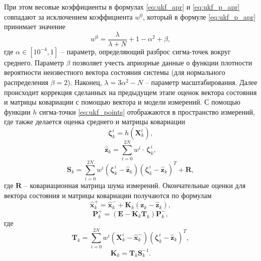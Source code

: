 При этом весовые коэффициенты в формулах \eqref{eq:ukf_apr} и \eqref{eq:ukf_p_apr} совпадают за исключением коэффициента  ${w^0}$, который в формуле \eqref{eq:ukf_p_apr} принимает значение \cite{Kulikova01}
\begin{equation}
w^0 = \frac{{{\lambda }}}{{{{\lambda }} + N}} + 1 - {{{\alpha }}^2} + {{\beta }},
\end{equation}
где
${{\alpha }} \in \left[ {{{10}^{ - 4}},1} \right]$
-- параметр, определяющий разброс сигма-точек вокруг среднего.
Параметр ${{\beta }}$  позволяет учесть априорные данные о функции плотности вероятности неизвестного вектора состояния системы (для нормального распределения  ${{\beta }} = 2$). Наконец, ${{\lambda }} = 3{{{\alpha }}^2} - N$ -- параметр масштабирования.
Далее происходит коррекция сделанных на предыдущем этапе оценок вектора состояния и матрицы ковариации с помощью вектора и модели измерений.
С помощью функции $h$ сигма-точки \eqref{eq:ukf_points} отображаются в пространство измерений, где также делается оценка среднего и матрицы ковариации
\begin{equation}
{\bm{\zeta }}_k^i = h\left( {{\bm{X}}_k^i} \right),
\end{equation}
\begin{equation}
{{{\bm{\hat z}}}_k} = \sum\limits_{i = 0}^{2N} {{w^i} \cdot } \,{\bm{\zeta }}_k^i,
\end{equation}
\begin{equation} \label{eq:ukf_s_k}
{{\bm{S}}_k} = \sum\limits_{i = 0}^{2N} {{w^i}\left( {{\bm{\zeta }}_k^i - {{{\bm{\hat z}}}_k}} \right)} {\left( {{\bm{\zeta }}_k^i - {{{\bm{\hat z}}}_k}} \right)^{{T}}} + {\bm{R}},
\end{equation}
где $\bm R$ -- ковариационная матрица шума измерений. Окончательные оценки для вектора состояния и матрицы ковариации получаются по формулам
\begin{equation}
{\bm{\hat x}}_k^ +  = {\bm{\hat x}}_k^ -  + {{\bm{K}}_k}({{\bm{z}}_k} - {{{\bm{\hat z}}}_k}),
\end{equation}
\begin{equation}
{\bm{P}}_k^ +  = \left( {{\bm{E}} - {{\bm{K}}_k}{{\bm{T}}_k}} \right){\bm{P}}_k^ - ,
\end{equation}
где
\begin{equation}
{{\bm{T}}_k} = \sum\limits_{i = 0}^{2N} {{w^i}\left( {{\bm{X}}_k^i - {\bm{\hat x}}_k^ - } \right)} {\left( {{\bm{\zeta }}_k^i - {{{\bm{\hat z}}}_k}} \right)^{{T}}},
\end{equation}
\begin{equation}
{{\bm{K}}_k} = {{\bm{T}}_k}{\bm{S}}_k^{ - 1}.
\end{equation}

